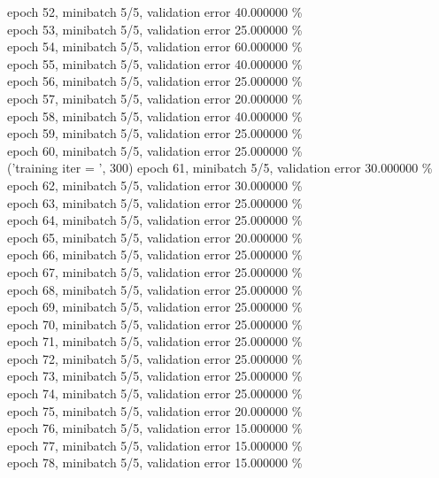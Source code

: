 \documentclass[a4paper]{article}
\begin{document}
epoch 52, minibatch 5/5, validation error 40.000000 \% \\
epoch 53, minibatch 5/5, validation error 25.000000 \% \\
epoch 54, minibatch 5/5, validation error 60.000000 \% \\
epoch 55, minibatch 5/5, validation error 40.000000 \% \\
epoch 56, minibatch 5/5, validation error 25.000000 \% \\
epoch 57, minibatch 5/5, validation error 20.000000 \% \\
epoch 58, minibatch 5/5, validation error 40.000000 \% \\
epoch 59, minibatch 5/5, validation error 25.000000 \% \\
epoch 60, minibatch 5/5, validation error 25.000000 \% \\
('training \@ iter = ', 300)
epoch 61, minibatch 5/5, validation error 30.000000 \% \\
epoch 62, minibatch 5/5, validation error 30.000000 \% \\
epoch 63, minibatch 5/5, validation error 25.000000 \% \\
epoch 64, minibatch 5/5, validation error 25.000000 \% \\
epoch 65, minibatch 5/5, validation error 20.000000 \% \\
epoch 66, minibatch 5/5, validation error 25.000000 \% \\
epoch 67, minibatch 5/5, validation error 25.000000 \% \\
epoch 68, minibatch 5/5, validation error 25.000000 \% \\
epoch 69, minibatch 5/5, validation error 25.000000 \% \\
epoch 70, minibatch 5/5, validation error 25.000000 \% \\
epoch 71, minibatch 5/5, validation error 25.000000 \% \\
epoch 72, minibatch 5/5, validation error 25.000000 \% \\
epoch 73, minibatch 5/5, validation error 25.000000 \% \\
epoch 74, minibatch 5/5, validation error 25.000000 \% \\
epoch 75, minibatch 5/5, validation error 20.000000 \% \\
epoch 76, minibatch 5/5, validation error 15.000000 \% \\
epoch 77, minibatch 5/5, validation error 15.000000 \% \\
epoch 78, minibatch 5/5, validation error 15.000000 \% \\
\end{document}
